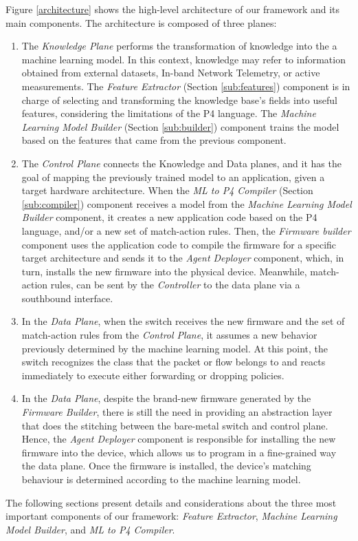 Figure \ref{architecture} shows the high-level architecture of our framework and its main components. The architecture is composed of three planes: 
\begin{enumerate}
    \item The \emph{Knowledge Plane} performs the transformation of knowledge into the a machine learning model. In this context, knowledge may refer to information obtained from external datasets, In-band Network Telemetry, or active measurements. The \emph{Feature Extractor} (Section \ref{sub:features}) component is in charge of selecting and transforming the knowledge base's fields into useful features, considering the limitations of the P4 language.
    The \emph{Machine Learning Model Builder} (Section \ref{sub:builder}) component trains the model based on the features that came from the previous component. 
    
    \item The \emph{Control Plane} connects the Knowledge and Data planes, and it has the goal of mapping the previously trained model to an application, given a target hardware architecture. When the \emph{ML to P4 Compiler} (Section \ref{sub:compiler}) component receives a model from the \emph{Machine Learning Model Builder} component, it creates a new application code based on the P4 language, and/or a new set of match-action rules. Then, the \emph{Firmware builder} component uses the application code to compile the firmware for a specific target architecture and sends it to the \emph{Agent Deployer} component, which, in turn, installs the new firmware into the physical device. Meanwhile, match-action rules, can be sent by the \emph{Controller} to the data plane via a southbound interface.

    \item In the \emph{Data Plane}, when the switch receives the new firmware and the set of match-action rules from the \emph{Control Plane}, it assumes a new behavior previously determined by the machine learning model. At this point, the switch recognizes the class that the packet or flow belongs to and reacts immediately to execute either forwarding or dropping policies.
    
    \item In the \emph{Data Plane}, despite the brand-new firmware generated by the \emph{Firmware Builder}, there is still the need in providing an abstraction layer that does the stitching between the bare-metal switch and control plane. Hence, the \emph{Agent Deployer} component is responsible for installing the new firmware into the device, which allows us to program in a fine-grained way the data plane. Once the firmware is installed, the device's matching behaviour is determined according to the machine learning model.
    \fi
\end{enumerate}

The following sections present details and considerations about the three most important components of our framework:  \emph{Feature Extractor}, \emph{Machine Learning Model Builder}, and \emph{ML to P4 Compiler}.

